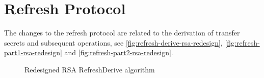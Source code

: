 \section{Refresh Protocol}
The changes to the refresh protocol are related to the derivation of transfer secrets and subsequent operations, see \autoref{fig:refresh-derive-rsa-redesign}, \autoref{fig:refresh-part1-rsa-redesign} and \autoref{fig:refresh-part2-rsa-redesign}.
\begin{figure}[htp]
    \centering
    \caption{Redesigned RSA RefreshDerive algorithm}
    \label{fig:refresh-derive-rsa-redesign}
\end{figure}

